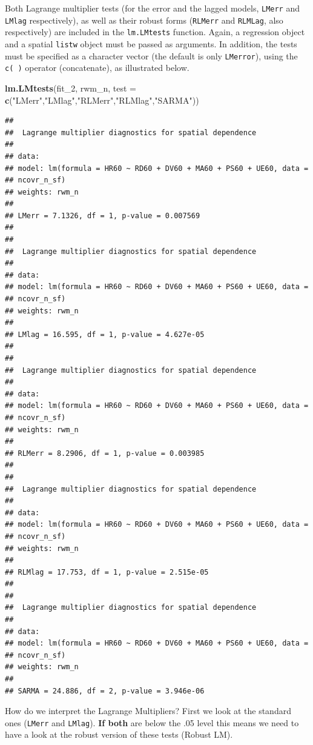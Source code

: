 \documentclass[]{book}
\newenvironment{Shaded}{\begin{snugshade}}{\end{snugshade}}
\newcommand{\DataTypeTok}[1]{\textcolor[rgb]{0.13,0.29,0.53}{#1}}
\newcommand{\DecValTok}[1]{\textcolor[rgb]{0.00,0.00,0.81}{#1}}
\newcommand{\KeywordTok}[1]{\textcolor[rgb]{0.13,0.29,0.53}{\textbf{#1}}}
\newcommand{\NormalTok}[1]{#1}
\newcommand{\StringTok}[1]{\textcolor[rgb]{0.31,0.60,0.02}{#1}}
\begin{document}
Both Lagrange multiplier tests (for the error and the lagged models, \texttt{LMerr} and \texttt{LMlag} respectively), as well as their robust forms (\texttt{RLMerr} and \texttt{RLMLag}, also respectively) are included in the \texttt{lm.LMtests} function. Again, a regression object and a spatial \texttt{listw} object must be passed as arguments. In addition, the tests must be specified as a character vector (the default is only \texttt{LMerror}), using the \texttt{c(\ )} operator (concatenate), as illustrated below.

\begin{Shaded}
\begin{Highlighting}[]
\KeywordTok{lm.LMtests}\NormalTok{(fit_}\DecValTok{2}\NormalTok{, rwm_n, }\DataTypeTok{test =} \KeywordTok{c}\NormalTok{(}\StringTok{"LMerr"}\NormalTok{,}\StringTok{"LMlag"}\NormalTok{,}\StringTok{"RLMerr"}\NormalTok{,}\StringTok{"RLMlag"}\NormalTok{,}\StringTok{"SARMA"}\NormalTok{))}
\end{Highlighting}
\end{Shaded}

\begin{verbatim}
## 
##  Lagrange multiplier diagnostics for spatial dependence
## 
## data:  
## model: lm(formula = HR60 ~ RD60 + DV60 + MA60 + PS60 + UE60, data =
## ncovr_n_sf)
## weights: rwm_n
## 
## LMerr = 7.1326, df = 1, p-value = 0.007569
## 
## 
##  Lagrange multiplier diagnostics for spatial dependence
## 
## data:  
## model: lm(formula = HR60 ~ RD60 + DV60 + MA60 + PS60 + UE60, data =
## ncovr_n_sf)
## weights: rwm_n
## 
## LMlag = 16.595, df = 1, p-value = 4.627e-05
## 
## 
##  Lagrange multiplier diagnostics for spatial dependence
## 
## data:  
## model: lm(formula = HR60 ~ RD60 + DV60 + MA60 + PS60 + UE60, data =
## ncovr_n_sf)
## weights: rwm_n
## 
## RLMerr = 8.2906, df = 1, p-value = 0.003985
## 
## 
##  Lagrange multiplier diagnostics for spatial dependence
## 
## data:  
## model: lm(formula = HR60 ~ RD60 + DV60 + MA60 + PS60 + UE60, data =
## ncovr_n_sf)
## weights: rwm_n
## 
## RLMlag = 17.753, df = 1, p-value = 2.515e-05
## 
## 
##  Lagrange multiplier diagnostics for spatial dependence
## 
## data:  
## model: lm(formula = HR60 ~ RD60 + DV60 + MA60 + PS60 + UE60, data =
## ncovr_n_sf)
## weights: rwm_n
## 
## SARMA = 24.886, df = 2, p-value = 3.946e-06
\end{verbatim}

How do we interpret the Lagrange Multipliers? First we look at the standard ones (\texttt{LMerr} and \texttt{LMlag}). \textbf{If both} are below the .05 level this means we need to have a look at the robust version of these tests (Robust LM).
\end{document}
